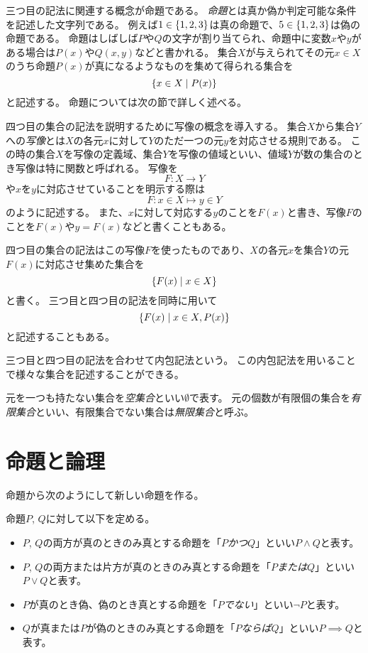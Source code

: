 三つ目の記法に関連する概念が命題である。
\emph{命題}とは真か偽か判定可能な条件を記述した文字列である。
例えば$1 \in \{ 1, 2, 3 \}$は真の命題で、$5 \in \{ 1, 2, 3 \}$は偽の命題である。
命題はしばしば$P$や$Q$の文字が割り当てられ、命題中に変数$x$や$y$がある場合は$P(x)$や$Q(x, y)$などと書かれる。
集合$X$が与えられてその元$x \in X$のうち命題$P(x)$が真になるようなものを集めて得られる集合を
$$
\{ x \in X \mid P(x) \}
$$
と記述する。
命題については次の節で詳しく述べる。

四つ目の集合の記法を説明するために写像の概念を導入する。
集合$X$から集合$Y$への\emph{写像}とは$X$の各元$x$に対して$Y$のただ一つの元$y$を対応させる規則である。
この時の集合$X$を写像の定義域、集合$Y$を写像の値域といい、値域$Y$が数の集合のとき写像は特に関数と呼ばれる。
写像を
$$
F: X \to Y
$$
や$x$を$y$に対応させていることを明示する際は
$$
F: x \in X \mapsto y \in Y
$$
のように記述する。
また、$x$に対して対応する$y$のことを$F(x)$と書き、写像$F$のことを$F(x)$や$y = F(x)$などと書くこともある。

四つ目の集合の記法はこの写像$F$を使ったものであり、$X$の各元$x$を集合$Y$の元$F(x)$に対応させ集めた集合を
$$
\{ F(x) \mid x \in X\}
$$
と書く。
三つ目と四つ目の記法を同時に用いて
$$
\{ F(x) \mid x \in X, P(x) \}
$$
と記述することもある。

三つ目と四つ目の記法を合わせて内包記法という。
この内包記法を用いることで様々な集合を記述することができる。

元を一つも持たない集合を\emph{空集合}といい$\emptyset$で表す。
元の個数が有限個の集合を\emph{有限集合}といい、有限集合でない集合は\emph{無限集合}と呼ぶ。

\section{命題と論理}

命題から次のようにして新しい命題を作る。

\begin{definition}[命題の演算]
命題$P$, $Q$に対して以下を定める。
\begin{itemize}
\item
$P$, $Q$の両方が真のときのみ真とする命題を「$P$\emph{かつ}$Q$」といい$P \land Q$と表す。
\item
$P$, $Q$の両方または片方が真のときのみ真とする命題を「$P$\emph{または}$Q$」といい$P \lor Q$と表す。
\item
$P$が真のとき偽、偽のとき真とする命題を「$P$\emph{でない}」といい$\lnot P$と表す。
\item
$Q$が真または$P$が偽のときのみ真とする命題を「$P$\emph{ならば}$Q$」といい$P \implies Q$と表す。
\end{itemize}
\end{definition}

